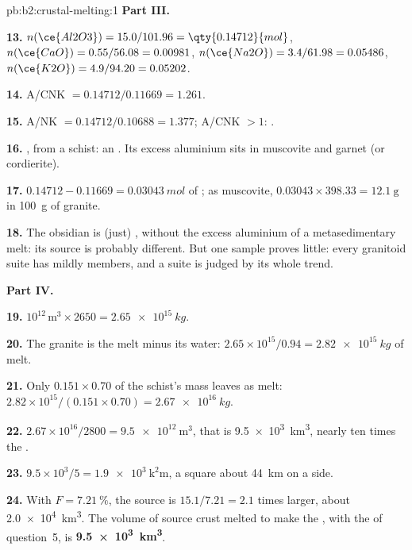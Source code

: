 \begin{solution}{pb:b2:crustal-melting:1}
\noindent\textbf{Part III.}

\textbf{13.} $n(\ce{Al2O3}) = 15.0/101.96 = \qty{0.14712}{mol}$, $n(\ce{CaO}) =
0.55/56.08 = 0.00981$, $n(\ce{Na2O}) = 3.4/61.98 = 0.05486$, $n(\ce{K2O}) = 4.9/94.20 =
0.05202$.

\textbf{14.} A/CNK $= 0.14712/0.11669 = 1.261$.

\textbf{15.} A/NK $= 0.14712/0.10688 = 1.377$; A/CNK $> 1$: .

\textbf{16.} , from a schist: an . Its excess aluminium sits in
muscovite and garnet (or cordierite).

\textbf{17.} $0.14712 - 0.11669 = \qty{0.03043}{mol}$ of ; as muscovite,
$0.03043\times398.33 = \qty{12.1}{\gram}$ in \qty{100}{\gram} of granite.

\textbf{18.} The obsidian is (just) , without the excess aluminium of a
metasedimentary melt: its source is probably different. But one sample proves little:
every granitoid suite has mildly  members, and a suite is judged by its whole
trend.

\noindent\textbf{Part IV.}

\textbf{19.} $10^{12}\,\unit{\cubic\metre}\times2650 = \qty{2.65e15}{kg}$.

\textbf{20.} The granite is the melt minus its water: $2.65\times10^{15}/0.94 =
\qty{2.82e15}{kg}$ of melt.

\textbf{21.} Only $0.151\times0.70$ of the schist's mass leaves as melt:
$2.82\times10^{15}/(0.151\times0.70) = \qty{2.67e16}{kg}$.

\textbf{22.} $2.67\times10^{16}/2800 = \qty{9.5e12}{\cubic\metre}$, that is
\qty{9.5e3}{\cubic\kilo\metre}, nearly ten times the .

\textbf{23.} $9.5\times10^3/5 = \qty{1.9e3}{\square\kilo\metre}$, a square about
\qty{44}{km} on a side.

\textbf{24.} With $F = \qty{7.21}{\percent}$, the source is $15.1/7.21 = 2.1$ times
larger, about \qty{2.0e4}{\cubic\kilo\metre}. The volume of source crust melted to make
the , with the  of question~5, is
\textbf{\qty[text-series-to-math=true]{9.5e3}{\cubic\kilo\metre}}.
\end{solution}

